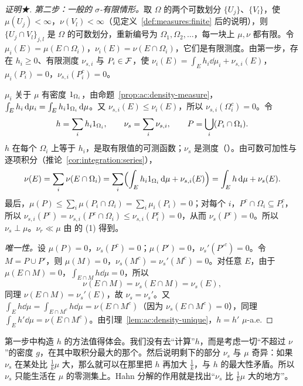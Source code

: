 \begin{proof}[证明★]
\emph{第二步：一般的 $\sigma$-有限情形。}取 $\Omega$ 的两个可数划分 $\{U_j\}$、$\{V_l\}$，使 $\mu(U_j)<\infty$，$\nu(V_l)<\infty$（见定义~\ref{def:measures:finite} 后的说明），则 $\{U_j\cap V_l\}_{j,l}$ 是 $\Omega$ 的可数划分，重新编号为 $\Omega_1,\Omega_2,\dots$，每一块上 $\mu,\nu$ 都有限。令 $\mu_i(E)=\mu(E\cap\Omega_i)$，$\nu_i(E)=\nu(E\cap\Omega_i)$，它们是有限测度。由第一步，存在 $h_i\geqslant0$、有限测度 $\nu_{s,i}$ 与 $P_i\in\mathcal{F}$，使 $\nu_i(E)=\int_Eh_i\dd\mu_i+\nu_{s,i}(E)$，$\mu_i(P_i)=0$，$\nu_{s,i}(P_i^c)=0$。

$\mu_i$ 关于 $\mu$ 有密度 $1_{\Omega_i}$，由命题~\ref{prop:ac:density-measure}，$\int_Eh_i\,\mathrm{d}\mu_i=\int_Eh_i1_{\Omega_i}\,\mathrm{d}\mu$。又 $\nu_{s,i}(E)\leqslant\nu_i(E)$，所以 $\nu_{s,i}(\Omega_i^c)=0$。令
\[
h=\sum_ih_i1_{\Omega_i},\qquad\nu_s=\sum_i\nu_{s,i},\qquad P=\bigcup_i(P_i\cap\Omega_i).
\]
$h$ 在每个 $\Omega_i$ 上等于 $h_i$，是取有限值的可测函数；$\nu_s$ 是测度（）。由可数可加性与逐项积分（推论~\ref{cor:integration:series}），
\[
\nu(E)=\sum_i\nu(E\cap\Omega_i)=\sum_i\Bigl(\int_Eh_i1_{\Omega_i}\,\mathrm{d}\mu+\nu_{s,i}(E)\Bigr)=\int_Eh\,\mathrm{d}\mu+\nu_s(E).
\]
最后，$\mu(P)\leqslant\sum_i\mu(P_i\cap\Omega_i)=\sum_i\mu_i(P_i)=0$；对每个 $i$，$P^c\cap\Omega_i\subseteq P_i^c$，所以 $\nu_{s,i}(P^c)=\nu_{s,i}(P^c\cap\Omega_i)\leqslant\nu_{s,i}(P_i^c)=0$，从而 $\nu_s(P^c)=0$。所以 $\nu_s\perp\mu$。$\nu_r\ll\mu$ 由 的 (1) 得到。

\emph{唯一性。}设 $\mu(P)=0$，$\nu_s(P^c)=0$；$\mu(P')=0$，$\nu_s'(P'^c)=0$。令 $M=P\cup P'$，则 $\mu(M)=0$，$\nu_s(M^c)=\nu_s'(M^c)=0$。对任意 $E$，由于 $\mu(E\cap M)=0$，$\int_{E\cap M}h\dd\mu=0$，所以
\[
\nu(E\cap M)=\nu_s(E\cap M)=\nu_s(E),
\]
同理 $\nu(E\cap M)=\nu_s'(E)$，故 $\nu_s=\nu_s'$。又 $\int_Eh\dd\mu=\int_{E\cap M^c}h\dd\mu=\nu(E\cap M^c)$（因为 $\nu_s(E\cap M^c)=0$），同理 $\int_Eh'\dd\mu=\nu(E\cap M^c)$。由引理~\ref{lem:ac:density-unique}，$h=h'$ $\mu$-a.e.
\end{proof}

\begin{remark}
第一步中构造 $h$ 的方法值得体会。我们没有去“计算”$h$，而是考虑一切“不超过 $\nu$”的密度 $g$，在其中取积分最大的那个。然后说明剩下的部分 $\nu_s$ 与 $\mu$ 奇异：如果 $\nu_s$ 在某处比 $\frac1k\mu$ 大，那么就可以在那里把 $h$ 再加大 $\frac1k$，与 $h$ 的最大性矛盾。所以 $\nu_s$ 只能生活在 $\mu$ 的零测集上。Hahn 分解的作用就是找出“$\nu_s$ 比 $\frac1k\mu$ 大的地方”。
\end{remark}

